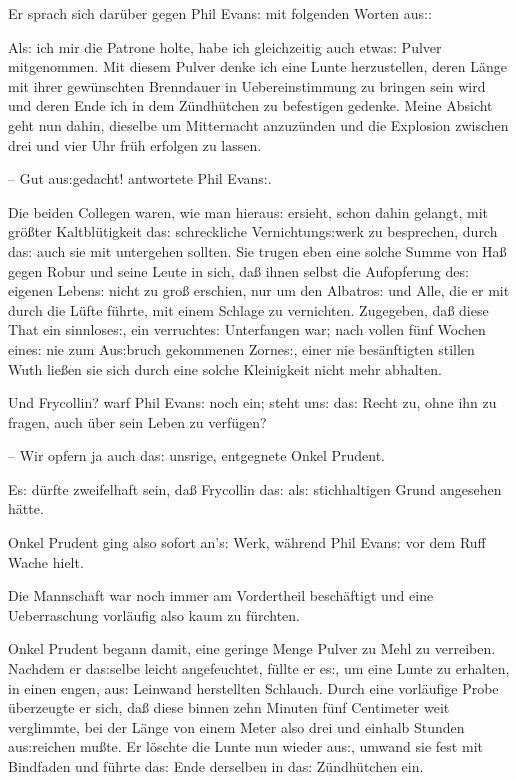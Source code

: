 \documentclass[oneside,12pt]{book}
\newcommand{\s}{s:}
\begin{document}
Er sprach sich dar\"uber gegen Phil Evan{\s} mit folgenden Worten
au{\s}:

{\glqq}Al{\s} ich mir die Patrone holte, habe ich gleichzeitig auch
etwa{\s} Pulver mitgenommen. Mit diesem Pulver denke ich eine Lunte
herzustellen, deren L\"ange mit ihrer gew\"unschten Brenndauer in
Uebereinstimmung zu bringen sein wird und deren Ende ich in dem
Z\"undh\"utchen zu befestigen gedenke. Meine Absicht geht nun dahin,
dieselbe um Mitternacht anzuz\"unden und die Explosion zwischen drei
und vier Uhr fr\"uh erfolgen zu lassen.

-- Gut au{\s}gedacht!{\grqq} antwortete Phil Evan{\s}.

Die beiden Collegen waren, wie man hierau{\s} ersieht, schon dahin
gelangt, mit gr\"o{\ss}ter Kaltbl\"utigkeit da{\s} schreckliche
Vernichtung{\s}werk zu besprechen, durch da{\s} auch sie mit
untergehen sollten. Sie trugen eben eine solche Summe von Ha{\ss}
gegen Robur und seine Leute in sich, da{\ss} ihnen selbst die
Aufopferung de{\s} eigenen Leben{\s} nicht zu gro{\ss} erschien, nur
um den {\glqq}Albatro{\s}{\grqq} und Alle, die er mit durch die
L\"ufte f\"uhrte, mit einem Schlage zu vernichten. Zugegeben, da{\ss}
diese That ein sinnlose{\s}, ein verruchte{\s} Unterfangen war; nach
vollen f\"unf Wochen eine{\s} nie zum Au{\s}bruch gekommenen
Zorne{\s}, einer nie bes\"anftigten stillen Wuth lie{\ss}en sie sich
durch eine solche Kleinigkeit nicht mehr abhalten.

{\glqq}Und Frycollin? warf Phil Evan{\s} noch ein; steht un{\s}
da{\s} Recht zu, ohne ihn zu fragen, auch \"uber sein Leben zu
verf\"ugen?

-- Wir opfern ja auch da{\s} unsrige,{\grqq} entgegnete Onkel
Prudent.

E{\s} d\"urfte zweifelhaft sein, da{\ss} Frycollin da{\s} al{\s}
stichhaltigen Grund angesehen h\"atte.

Onkel Prudent ging also sofort an'{\s} Werk, w\"ahrend Phil Evan{\s}
vor dem Ruff Wache hielt.

Die Mannschaft war noch immer am Vordertheil besch\"aftigt und eine
Ueberraschung vorl\"aufig also kaum zu f\"urchten.

Onkel Prudent begann damit, eine geringe Menge Pulver zu Mehl zu
verreiben. Nachdem er da{\s}selbe leicht angefeuchtet, f\"ullte er
e{\s}, um eine Lunte zu erhalten, in einen engen, au{\s} Leinwand
herstellten Schlauch. Durch eine vorl\"aufige Probe \"uberzeugte er
sich, da{\ss} diese binnen zehn Minuten f\"unf Centimeter weit
verglimmte, bei der L\"ange von einem Meter also drei und einhalb
Stunden au{\s}reichen mu{\ss}te. Er l\"oschte die Lunte nun wieder
au{\s}, umwand sie fest mit Bindfaden und f\"uhrte da{\s} Ende
derselben in da{\s} Z\"undh\"utchen ein.
\end{document}

